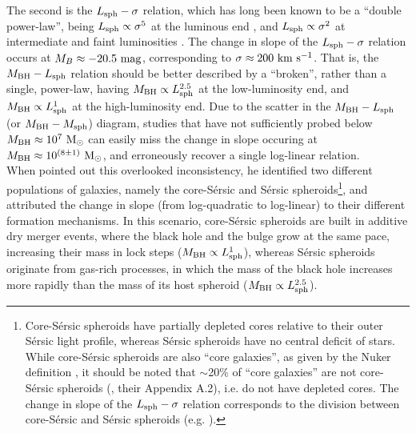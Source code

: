 \documentclass[preprint2]{emulateapj}
\begin{document}
The second is the $L_{\rm sph} - \sigma$ relation, 
which has long been known to be a ``double power-law'', 
being $L_{\rm sph} \propto \sigma^5$ at the luminous end \citep{schechter1980,malumuthkrishner1981,vonderlinden2007,liu2008}, 
and $L_{\rm sph} \propto \sigma^2$ at intermediate and faint luminosities 
\citep{davies1983,held1992,matkovicguzman2005,derijcke2005,balcells2007screl,chilingarian2008,forbes2008,cody2009,tortora2009,kourkchi2012}. 
The change in slope of the $L_{\rm sph} - \sigma$ relation occurs at $M_B \approx -20.5\rm~mag$, 
corresponding to $\sigma \approx 200~\rm km~s^{-1}$. 
That is, the $M_{\rm BH} - L_{\rm sph}$ relation should be better described by a ``broken'', rather than a single, power-law, 
having $M_{\rm BH} \propto L_{\rm sph}^{2.5}$ at the low-luminosity end, 
and $M_{\rm BH} \propto L_{\rm sph}^1$ at the high-luminosity end.  
Due to the scatter in the $M_{\rm BH} - L_{\rm sph}$ (or $M_{\rm BH} - M_{\rm sph}$) diagram, 
studies that have not sufficiently probed below $M_{\rm BH} \approx 10^7\rm~M_\odot$ 
can easily miss the change in slope occuring at $M_{\rm BH} \approx 10^{(8 \pm 1)}\rm~M_\odot$, 
and erroneously recover a single log-linear relation. \\
When \cite{graham2012bent} pointed out this overlooked inconsistency, 
he identified two different populations of galaxies, 
namely the core-S\'ersic \citep{graham2003coresersicmodel,trujillo2004coresersicmodel} and S\'ersic 
spheroids\footnote{Core-S\'ersic spheroids have partially depleted cores relative to their outer S\'ersic light profile, 
whereas S\'ersic spheroids have no central deficit of stars. 
While core-S\'ersic spheroids are also ``core galaxies'', as given by the Nuker definition \citep{lauer2007lumell},
it should be noted that $\sim$20\% of ``core galaxies'' are not core-S\'ersic spheroids 
(\citealt{dullograham2014cores}, their Appendix A.2), i.e. do not have depleted cores.
The change in slope of the $L_{\rm sph} - \sigma$ relation corresponds to the division between 
core-S\'ersic and S\'ersic spheroids (e.g. \citealt{grahamguzman2003}).},
and attributed the change in slope (from log-quadratic to log-linear) to their different formation mechanisms. 
In this scenario, core-S\'ersic spheroids are built in additive dry merger events, 
where the black hole and the bulge grow at the same pace, increasing their mass in lock steps ($M_{\rm BH} \propto L_{\rm sph}^1$), 
whereas S\'ersic spheroids originate from gas-rich processes, 
in which the mass of the black hole increases more rapidly than the mass of its host spheroid ($M_{\rm BH} \propto L_{\rm sph}^{2.5}$). 
\end{document}
